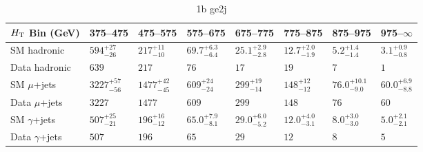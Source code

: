 \documentclass[8pt]{article}
\def\scalht{\mbox{$H_{\rm{T}}$}\xspace}
\newcommand\T{\rule{0pt}{2.6ex}}
\newcommand\B{\rule[-1.2ex]{0pt}{0pt}}
\begin{document}
\begin{table}[ht!]
\caption{1b ge2j}
\label{tab:ensemble-1b ge2j}
\centering
\begin{tabular}{ llllllll }

\hline
\scalht Bin (GeV)       & 375--475                       & 475--575                       & 575--675                       & 675--775                       & 775--875                       & 875--975                       & 975--$\infty$                  \\ [1.000000ex]
\hline
SM hadronic\T           & $594^{+27}_{-26}$              & $217^{+11}_{-10}$              & $69.7^{+6.3}_{-6.4}$           & $25.1^{+2.9}_{-2.8}$           & $12.7^{+2.0}_{-1.9}$           & $5.2^{+1.4}_{-1.4}$            & $3.1^{+0.9}_{-0.8}$            \\ 
Data hadronic\B         & $639$                          & $217$                          & $76$                           & $17$                           & $19$                           & $7$                            & $1$                            \\ 
\hline
SM $\mu$+jets\T         & $3227^{+57}_{-56}$             & $1477^{+42}_{-45}$             & $609^{+24}_{-24}$              & $299^{+19}_{-14}$              & $148^{+12}_{-12}$              & $76.0^{+10.1}_{-9.0}$          & $60.0^{+6.9}_{-8.8}$           \\ 
Data $\mu$+jets\B       & $3227$                         & $1477$                         & $609$                          & $299$                          & $148$                          & $76$                           & $60$                           \\ 
\hline
SM $\gamma$+jets\T      & $507^{+25}_{-21}$              & $196^{+16}_{-12}$              & $65.0^{+7.9}_{-8.1}$           & $29.0^{+6.0}_{-5.2}$           & $12.0^{+4.0}_{-3.1}$           & $8.0^{+3.0}_{-3.0}$            & $5.0^{+2.1}_{-2.1}$            \\ 
Data $\gamma$+jets\B    & $507$                          & $196$                          & $65$                           & $29$                           & $12$                           & $8$                            & $5$                            \\ 
\hline

\end{tabular}
\end{table}
\end{document}
